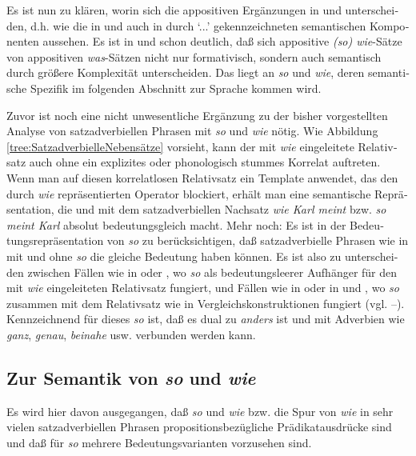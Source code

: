 \documentclass[output=paper, colorlinks, citecolor=brown, booklanguage=german]{langscibook}
\begin{document}
\begin{otherlanguage}{german}
Es ist nun zu klären, worin sich die appositiven Ergänzungen in  und  unterscheiden, d.h. wie die in  und auch in  durch `...' gekennzeichneten semantischen Komponenten aussehen. Es ist in  und  schon deutlich, daß sich appositive \textit{(so) wie}-Sätze von appositiven \textit{was}-Sätzen nicht nur formativisch, sondern auch semantisch durch größere Komplexität unterscheiden. Das liegt an \textit{so} und \textit{wie}, deren semantische Spezifik im folgenden Abschnitt zur Sprache kommen wird.

Zuvor ist noch eine nicht unwesentliche Ergänzung zu der bisher vorgestellten Analyse von satzadverbiellen Phrasen mit \textit{so} und \textit{wie} nötig. Wie Abbildung \ref{tree:SatzadverbielleNebensätze} vorsieht, kann der mit \textit{wie} eingeleitete Relativsatz auch ohne ein explizites oder phonologisch stummes Korrelat auftreten. Wenn man auf diesen korrelatlosen Relativsatz ein Template anwendet, das den durch \textit{wie} repräsentierten Operator blockiert, erhält man eine semantische Repräsentation, die  und  mit dem satzadverbiellen Nachsatz \textit{wie Karl meint} bzw. \textit{so meint Karl} absolut bedeutungsgleich macht. Mehr noch: Es ist in der Bedeutungsrepräsentation von \textit{so} zu berücksichtigen, daß satzadverbielle Phrasen wie in  mit und ohne \textit{so} die gleiche Bedeutung haben können. Es ist also zu unterscheiden zwischen Fällen wie in  oder , wo \textit{so} als bedeutungsleerer Aufhänger für den mit \textit{wie} eingeleiteten Relativsatz fungiert, und Fällen wie in  oder in  und , wo \textit{so} zusammen mit dem Relativsatz wie in Vergleichskonstruktionen fungiert (vgl. --). Kennzeichnend für dieses \textit{so} ist, daß es dual zu \textit{anders} ist und mit Adverbien wie \textit{ganz}, \textit{genau}, \textit{beinahe} usw. verbunden werden kann.

\subsection{Zur Semantik von \textit{so} und \textit{wie}} \label{sec:zi97:3.3}

Es wird hier davon ausgegangen, daß \textit{so} und \textit{wie} bzw. die Spur von \textit{wie} in sehr vielen satzadverbiellen Phrasen propositionsbezügliche Prädikatausdrücke sind und daß für \textit{so} mehrere Bedeutungsvarianten vorzusehen sind.


\end{otherlanguage}
\end{document}
